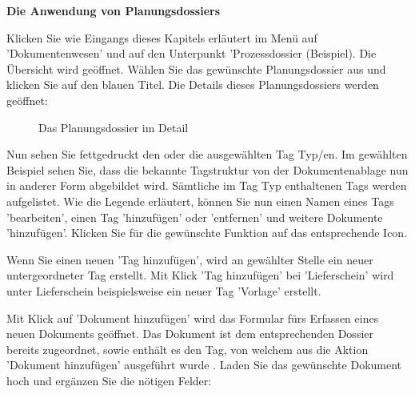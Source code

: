 \textbf{Die Anwendung von Planungsdossiers}

Klicken Sie wie Eingangs dieses Kapitels erläutert im Menü auf 'Dokumentenwesen' und auf den Unterpunkt 'Prozessdossier (Beispiel). Die Übersicht wird geöffnet. Wählen Sie das gewünschte Planungsdossier aus und klicken Sie auf den blauen Titel. Die Details dieses Planungsdossiers werden geöffnet:

\begin{figure}[H]
\caption{Das Planungsdossier im Detail}
\end{figure}

Nun sehen Sie fettgedruckt den oder die ausgewählten Tag Typ/en. Im gewählten Beispiel sehen Sie, dass die bekannte Tagstruktur von der Dokumentenablage nun in anderer Form abgebildet wird. Sämtliche im Tag Typ enthaltenen Tags werden aufgelistet. Wie die Legende erläutert, können Sie nun einen Namen eines Tags 'bearbeiten', einen Tag 'hinzufügen' oder 'entfernen' und weitere Dokumente 'hinzufügen'. Klicken Sie für die gewünschte Funktion auf das entsprechende Icon.

\vspace{\baselineskip}

Wenn Sie einen neuen 'Tag hinzufügen', wird an gewählter Stelle ein neuer untergeordneter Tag erstellt. Mit Klick 'Tag hinzufügen' bei 'Lieferschein' wird unter Lieferschein beispielsweise ein neuer Tag 'Vorlage' erstellt.

\vspace{\baselineskip}

Mit Klick auf 'Dokument hinzufügen' wird das Formular fürs Erfassen eines neuen Dokuments geöffnet. Das Dokument ist dem entsprechenden Dossier  bereits zugeordnet, sowie enthält es den Tag, von welchem aus die Aktion 'Dokument hinzufügen' ausgeführt wurde . Laden Sie das gewünschte Dokument hoch  und ergänzen Sie die nötigen Felder:

